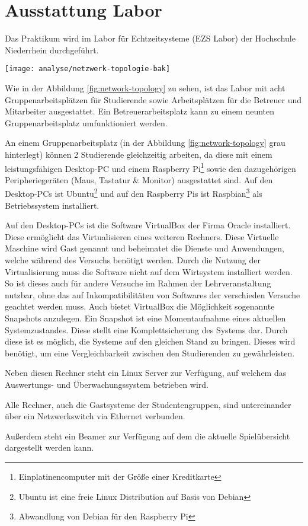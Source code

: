 \section{Ausstattung Labor}
\label{sec:Ausstattung_Labor}

Das Praktikum wird im Labor für Echtzeitsysteme (EZS Labor) der Hochschule Niederrhein durchgeführt.

\begin{center}
	\texttt{[image: analyse/netzwerk-topologie-bak]}
	\label{fig:network-topology}
\end{center}

Wie in der Abbildung \ref{fig:network-topology} zu sehen, ist das Labor mit acht Gruppenarbeitsplätzen für Studierende sowie Arbeitsplätzen für die Betreuer und Mitarbeiter ausgestattet. Ein Betreuerarbeitsplatz kann zu einem neunten Gruppenarbeitsplatz umfunktioniert werden.

An einem Gruppenarbeitsplatz (in der Abbildung \ref{fig:network-topology} grau hinterlegt) können 2 Studierende gleichzeitig arbeiten, da diese mit einem leistungsfähigen Desktop-PC und einem Raspberry Pi\footnote{Einplatinencomputer mit der Größe einer Kreditkarte} sowie den dazugehörigen Peripheriegeräten (Maus, Tastatur \& Monitor) ausgestattet sind.
Auf den Desktop-PCs ist Ubuntu\footnote{Ubuntu ist eine freie Linux Distribution auf Basis von Debian} und auf den Raspberry Pis ist Raspbian\footnote{Abwandlung von Debian für den Raspberry Pi} als Betriebssystem installiert.

Auf den Desktop-PCs ist die Software VirtualBox der Firma Oracle installiert. Diese ermöglicht das Virtualisieren eines weiteren Rechners. Diese Virtuelle Maschine wird Gast genannt und beheimatet die Dienste und Anwendungen, welche während des Versuchs benötigt werden. Durch die Nutzung der Virtualisierung muss die Software nicht auf dem Wirtsystem installiert werden. So ist dieses auch für andere Versuche im Rahmen der Lehrveranstaltung nutzbar, ohne das auf Inkompatibilitäten von Softwares der verschieden Versuche geachtet werden muss. Auch bietet VirtualBox die Möglichkeit sogenannte Snapshots anzulegen. Ein Snapshot ist eine Momentaufnahme eines aktuellen Systemzustandes. Diese stellt eine Komplettsicherung des Systems dar. Durch diese ist es möglich, die Systeme auf den gleichen Stand zu bringen. Dieses wird benötigt, um eine Vergleichbarkeit zwischen den Studierenden zu gewährleisten.\cite{oraclecorporationOracleVMVirtualBox2020}

Neben diesen Rechner steht ein Linux Server zur Verfügung, auf welchem das Auswertungs- und Überwachungssystem betrieben wird.

Alle Rechner, auch die Gastsysteme der Studentengruppen, sind untereinander über ein Netzwerkswitch via Ethernet verbunden.

Außerdem steht ein Beamer zur Verfügung auf dem die aktuelle Spielübersicht dargestellt werden kann.